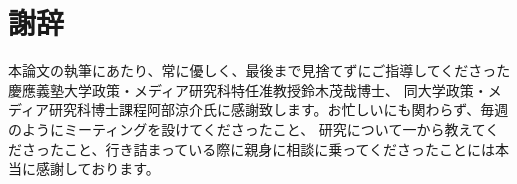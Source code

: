 \chapter*{謝辞}
\label{thanks}

本論文の執筆にあたり、常に優しく、最後まで見捨てずにご指導してくださった慶應義塾大学政策・メディア研究科特任准教授鈴木茂哉博士、
同大学政策・メディア研究科博士課程阿部涼介氏に感謝致します。お忙しいにも関わらず、毎週のようにミーティングを設けてくださったこと、
研究について一から教えてくださったこと、行き詰まっている際に親身に相談に乗ってくださったことには本当に感謝しております。

